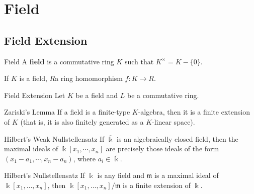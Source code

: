 
\chapter{Field}
\section{Field Extension}
\begin{definition}{Field}{}
    A \textbf{field} is a commutative ring $K$ such that $K^{\times}=K-\{0\}$.
\end{definition}

\begin{proposition}{}{}
    If $K$ is a field, $R$a ring homomorphism $f:K\to R$.
\end{proposition}

\begin{definition}{Field Extension}{}
    Let $K$ be a field and $L$ be a commutative ring. 
\end{definition}


\begin{lemma}{Zariski's Lemma}{}
    If a field is a finite-type $K$-algebra, then it is a finite extension of $K$ (that is, it is also finitely generated as a $K$-linear space).
\end{lemma}


\begin{theorem}{Hilbert's Weak Nullstellensatz}{}
    If $\overline{\Bbbk}$ is an algebraically closed field, then the maximal ideals of $\overline{\Bbbk}\left[x_1, \cdots, x_n\right]$ are precisely those ideals of the form $\left(x_1-a_1, \cdots, x_n-a_{n}\right)$, where $a_i\in \overline{\Bbbk}$. 
\end{theorem}


\begin{theorem}{Hilbert's Nullstellensatz}{}
    If $\Bbbk$ is any field and $\mathfrak{m}$ is a maximal ideal of $\Bbbk\left[x_1, \ldots, x_n\right]$, then $\Bbbk\left[x_1, \ldots, x_n\right]/\mathfrak{m}$ is a finite extension of $\Bbbk$.
\end{theorem}
